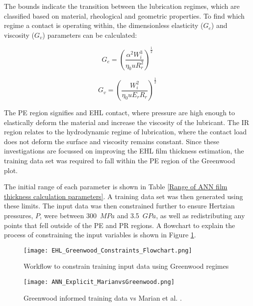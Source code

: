The bounds indicate the transition between the lubrication regimes, which are classified based on material, rheological and geometric properties. To find which regime a contact is operating within, the dimensionless elasticity ($G_e$) and viscosity ($G_v$) parameters can be calculated:

\begin{equation}\label{G_e}
	G_e=\left(\frac{\alpha^2 W_i^3}{\eta_0 u R_r^2}\right)^{\frac{1}{2}}
\end{equation}

\begin{equation}\label{G_v}
	G_v=\left(\frac{W_i^2}{\eta_0 u E_r R_r}\right)^{\frac{1}{2}}
\end{equation}

The PE region signifies and EHL contact, where pressure are high enough to elastically deform the material and increase the viscosity of the lubricant. The IR region relates to the hydrodynamic regime of lubrication, where the contact load does not deform the surface and viscosity remains constant. Since these investigations are focussed on improving the EHL film thickness estimation, the training data set was required to fall within the PE region of the Greenwood plot. 

The initial range of each parameter is shown in Table \ref{Range of ANN film thickness calculation parameters}. A training data set was then generated using these limits. The input data was then constrained further to ensure Hertzian pressures, $P$, were between 300~$MPa$ and 3.5~$GPa$, as well as redistributing any points that fell outside of the PE and PR regions. A flowchart to explain the process of constraining the input variables is shown in Figure \ref{EHL_Greenwood_Constraints_Flowchart}.

\begin{figure}
	\centering  
	\texttt{[image: EHL\_Greenwood\_Constraints\_Flowchart.png]}
	\caption{Workflow to constrain training input data using Greenwood regimes}
	\label{EHL_Greenwood_Constraints_Flowchart}
\end{figure} 

\begin{figure}
	\centering  
	\texttt{[image: ANN\_Explicit\_MarianvsGreenwood.png]}
	\caption[Greenwood informed training data vs Marian et al.]{Greenwood informed training data vs Marian et al. \cite{Marian2022}.}
	\label{Greenwood informed training data vs Marian et al.}
\end{figure} 

